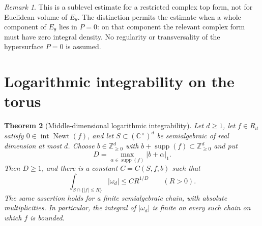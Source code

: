 \documentclass[11pt]{article}
\numberwithin{equation}{section}
\newtheorem{theorem}{Theorem}[section]
\theoremstyle{definition}
\theoremstyle{remark}
\newtheorem{remark}[theorem]{Remark}
\newcommand{\C}{\mathbb C}
\newcommand{\Z}{\mathbb Z}
\newcommand{\Newt}{\operatorname{Newt}}
\newcommand{\supp}{\operatorname{supp}}
\newcommand{\Int}{\operatorname{int}}
\newcommand{\torus}{(\C^\times)^d}
\newcommand{\omegaD}{\omega_d}
\begin{document}
\begin{remark}
This is a sublevel estimate for a restricted complex top form, not for
Euclidean volume of $E_\theta$. The distinction permits the estimate
when a whole component of $E_\theta$ lies in $P=0$: on that component
the relevant complex form must have zero integral density. No regularity
or transversality of the hypersurface $P=0$ is assumed.
\end{remark}

\section{Logarithmic integrability on the torus}\label{sec:log-integrability}
\begin{theorem}[Middle-dimensional logarithmic integrability]\label{thm:log-integrability}
Let $d\ge1$, let $f\in R_d$ satisfy $0\in\Int\Newt(f)$, and let
$S\subset\torus$ be semialgebraic of real dimension at most $d$.
Choose $b\in\Z_{\ge0}^d$ with $b+\supp(f)\subset\Z_{\ge0}^d$ and put
\[
 D=\max_{\alpha\in\supp(f)}|b+\alpha|_1.
\]
Then $D\ge1$, and there is a constant $C=C(S,f,b)$ such that
\begin{equation}\label{eq:log-integrability}
 \int_{S\cap\{|f|\le R\}}|\omegaD|
 \le CR^{1/D}\qquad(R>0).
\end{equation}
The same assertion holds for a finite semialgebraic chain, with absolute
multiplicities. In particular, the integral of $|\omegaD|$ is finite
on every such chain on which $f$ is bounded.
\end{theorem}
\end{document}

